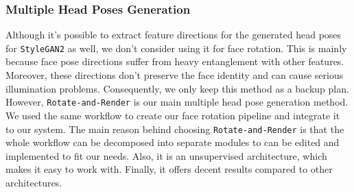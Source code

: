 \subsubsection{Multiple Head Poses Generation}
Although it's possible to extract feature directions for the generated head poses for \texttt{StyleGAN2} as well, we don't consider using it for face rotation. This is mainly because face pose directions suffer from heavy entanglement with other features. Moreover, these directions don't preserve the face identity and can cause serious illumination problems. Consequently, we only keep this method as a backup plan. However, \texttt{Rotate-and-Render} is our main multiple head pose generation method. We used the same workflow to create our face rotation pipeline and integrate it to our system. The main reason behind choosing \texttt{Rotate-and-Render} is that the whole workflow can be decomposed into separate modules to can be edited and implemented to fit our needs. Also, it is an unsupervised architecture, which makes it easy to work with. Finally, it offers decent results compared to other architectures.
